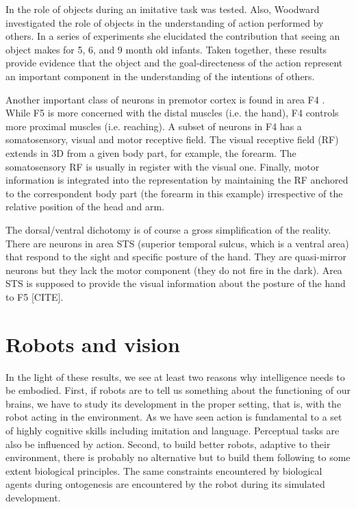 In \cite{wohlsclager02human} the role of objects during an imitative 
task was tested. Also, Woodward \cite{woodward98infants} investigated the role 
of objects in the understanding of action performed by others. In a series 
of experiments she elucidated the contribution that seeing an object 
makes for 5, 6, and 9 month old infants. Taken together, these results provide 
evidence that the object and the goal-directeness of the action represent 
an important component in the understanding of the intentions of others.


\ifverbose
Another important class of neurons in premotor cortex is found in area
F4 \cite{fogassi96coding}. While F5 is more concerned with the distal
muscles (i.e. the hand), F4 controls more proximal muscles
(i.e. reaching). A subset of neurons in F4 has a somatosensory, visual
and motor receptive field. The visual receptive field (RF) extends in
3D from a given body part, for example, the forearm. The somatosensory
RF is usually in register with the visual one. Finally, motor
information is integrated into the representation by maintaining the
RF anchored to the correspondent body part (the forearm in this
example) irrespective of the relative position of the head and arm.
\fi

\ifverbose
The dorsal/ventral dichotomy is of course a gross simplification of
the reality.  There are neurons in area STS (superior temporal sulcus,
which is a ventral area) that respond to the sight and specific
posture of the hand. They are quasi-mirror neurons but they lack the
motor component (they do not fire in the dark).  Area STS is supposed
to provide the visual information about the posture of the hand to F5
[CITE].
\fi

\ifverbose

\section{Robots and vision}

In the light of these results, we see at least two reasons why
intelligence needs to be embodied. First, if robots are to tell us
something about the functioning of our brains, we have to study its
development in the proper setting, that is, with the robot acting in
the environment. As we have seen action is fundamental to a set of
highly cognitive skills including imitation and language. Perceptual
tasks are also be influenced by action. Second, to build better
robots, adaptive to their environment, there is probably no
alternative but to build them following to some extent biological
principles. The same constraints encountered by biological agents
during ontogenesis are encountered by the robot during its simulated
development.

